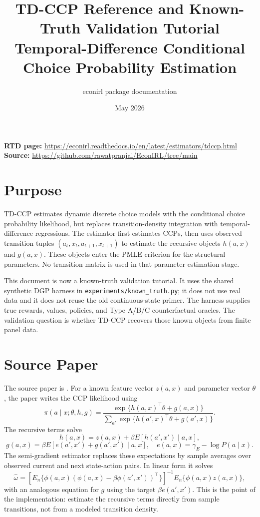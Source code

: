 \documentclass[10pt]{article}
\title{TD-CCP Reference and Known-Truth Validation Tutorial\\[3pt]
\large Temporal-Difference Conditional Choice Probability Estimation}
\author{econirl package documentation}
\date{May 2026}
\begin{document}
\maketitle

\begin{center}
\small
\textbf{RTD page:}
\url{https://econirl.readthedocs.io/en/latest/estimators/tdccp.html}
\quad
\textbf{Source:}
\url{https://github.com/rawatpranjal/EconIRL/tree/main}
\end{center}

\section{Purpose}

TD-CCP estimates dynamic discrete choice models with the conditional choice
probability likelihood, but replaces transition-density integration with
temporal-difference regressions. The estimator first estimates CCPs, then uses
observed transition tuples \((a_t,x_t,a_{t+1},x_{t+1})\) to estimate the
recursive objects \(h(a,x)\) and \(g(a,x)\). These objects enter the PMLE
criterion for the structural parameters. No transition matrix is used in that
parameter-estimation stage.

This document is now a known-truth validation tutorial. It uses the shared
synthetic DGP harness in \texttt{experiments/known\_truth.py}; it does not use
real data and it does not reuse the old continuous-state primer. The harness
supplies true rewards, values, policies, and Type A/B/C counterfactual oracles.
The validation question is whether TD-CCP recovers those known objects from
finite panel data.

\section{Source Paper}

The source paper is \citet{adusumilliEckardt2025}. For a known feature vector
\(z(a,x)\) and parameter vector \(\theta\), the paper writes the CCP likelihood
using
\[
\pi(a\mid x;\theta,h,g)
=
\frac{\exp\{h(a,x)^\top\theta + g(a,x)\}}
{\sum_{a'}\exp\{h(a',x)^\top\theta + g(a',x)\}}.
\]
The recursive terms solve
\[
h(a,x)=z(a,x)+\beta E[h(a',x')\mid a,x],
\]
\[
g(a,x)=\beta E[e(a',x')+g(a',x')\mid a,x],
\quad
e(a,x)=\gamma_E-\log P(a\mid x).
\]
The semi-gradient estimator replaces these expectations by sample averages
over observed current and next state-action pairs. In linear form it solves
\[
\hat\omega
=
\left[
E_n\{\phi(a,x)(\phi(a,x)-\beta\phi(a',x'))^\top\}
\right]^{-1}
E_n\{\phi(a,x)z(a,x)\},
\]
with an analogous equation for \(g\) using the target
\(\beta e(a',x')\). This is the point of the implementation: estimate the
recursive terms directly from sample transitions, not from a modeled
transition density.
\end{document}
